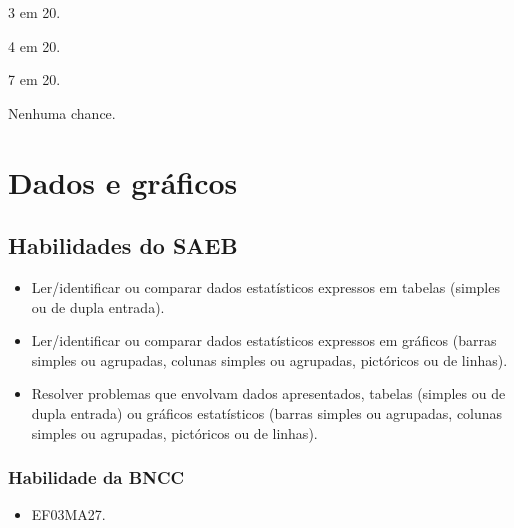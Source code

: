 \begin{escolha}
\begin{multicols}{2}
\item
3 em 20.
\item
4 em 20.
\item
7 em 20.
\item
Nenhuma chance.
\end{multicols}
\end{escolha}

\chapter{Dados e gráficos}

\section*{Habilidades do SAEB}

\begin{itemize}
\item Ler/identificar ou comparar dados estatísticos expressos em tabelas
(simples ou de dupla entrada).

\item Ler/identificar ou comparar dados estatísticos expressos em gráficos
(barras simples ou agrupadas, colunas simples ou agrupadas, pictóricos
ou de linhas).

\item Resolver problemas que envolvam dados apresentados, tabelas (simples ou
de dupla entrada) ou gráficos estatísticos (barras simples ou agrupadas,
colunas simples ou agrupadas, pictóricos ou de linhas).
\end{itemize}

\subsection{Habilidade da BNCC}

\begin{itemize}
  \item 
 EF03MA27.
\end{itemize}

\pagebreak

